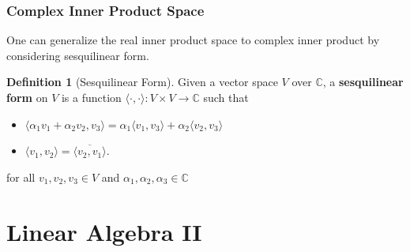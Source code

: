 \documentclass[12pt, a4paper]{article}
\newcommand{\inner}[1]{\langle #1 \rangle}
\theoremstyle{remark}
\theoremstyle{definition}
\newtheorem{definition}{Definition}
\numberwithin{equation}{section}
\numberwithin{definition}{section}
\numberwithin{example}{section}
\numberwithin{exercise}{section}
\numberwithin{remark}{section}
\numberwithin{figure}{section}
\begin{document}
\section{Complex Inner Product Space}
One can generalize the real inner product space to complex inner product by considering
sesquilinear form.
\begin{definition}[Sesquilinear Form]
    Given a vector space $V$ over $\mathbb{C}$,
    a \textbf{sesquilinear form} on $V$ is a function $\inner{\cdot, \cdot} : V \times V \rightarrow \mathbb{C}$
    such that
    \begin{itemize}
        \item $\inner{\alpha_1 v_1 + \alpha_2 v_2, v_3} = \alpha_1 \inner{v_1, v_3} + \alpha_2 \inner{v_2, v_3}$
        \item $\inner{v_1, v_2} = \overline{\inner{v_2, v_1}}$.
    \end{itemize}
    for all $v_1, v_2, v_3 \in V$ and $\alpha_1, \alpha_2, \alpha_3 \in \mathbb{C}$
\end{definition}

\part{Linear Algebra II}
\end{document}
